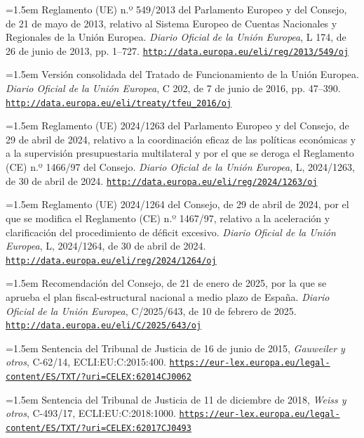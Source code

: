 \documentclass[10pt,a4paper]{article}
\begin{document}
\noindent\hangindent=1.5em Reglamento (UE) n.º 549/2013 del Parlamento Europeo y del Consejo, de 21 de mayo de 2013, relativo al Sistema Europeo de Cuentas Nacionales y Regionales de la Unión Europea. \textit{Diario Oficial de la Unión Europea}, L 174, de 26 de junio de 2013, pp. 1--727. \href{http://data.europa.eu/eli/reg/2013/549/oj}{\nolinkurl{http://data.europa.eu/eli/reg/2013/549/oj}}

\noindent\hangindent=1.5em Versión consolidada del Tratado de Funcionamiento de la Unión Europea. \textit{Diario Oficial de la Unión Europea}, C 202, de 7 de junio de 2016, pp. 47--390. \href{http://data.europa.eu/eli/treaty/tfeu_2016/oj}{\nolinkurl{http://data.europa.eu/eli/treaty/tfeu_2016/oj}}

\noindent\hangindent=1.5em Reglamento (UE) 2024/1263 del Parlamento Europeo y del Consejo, de 29 de abril de 2024, relativo a la coordinación eficaz de las políticas económicas y a la supervisión presupuestaria multilateral y por el que se deroga el Reglamento (CE) n.º 1466/97 del Consejo. \textit{Diario Oficial de la Unión Europea}, L, 2024/1263, de 30 de abril de 2024. \href{http://data.europa.eu/eli/reg/2024/1263/oj}{\nolinkurl{http://data.europa.eu/eli/reg/2024/1263/oj}}

\noindent\hangindent=1.5em Reglamento (UE) 2024/1264 del Consejo, de 29 de abril de 2024, por el que se modifica el Reglamento (CE) n.º 1467/97, relativo a la aceleración y clarificación del procedimiento de déficit excesivo. \textit{Diario Oficial de la Unión Europea}, L, 2024/1264, de 30 de abril de 2024. \href{http://data.europa.eu/eli/reg/2024/1264/oj}{\nolinkurl{http://data.europa.eu/eli/reg/2024/1264/oj}}

\noindent\hangindent=1.5em Recomendación del Consejo, de 21 de enero de 2025, por la que se aprueba el plan fiscal-estructural nacional a medio plazo de España. \textit{Diario Oficial de la Unión Europea}, C/2025/643, de 10 de febrero de 2025. \href{http://data.europa.eu/eli/C/2025/643/oj}{\nolinkurl{http://data.europa.eu/eli/C/2025/643/oj}}

\noindent\hangindent=1.5em Sentencia del Tribunal de Justicia de 16 de junio de 2015, \textit{Gauweiler y otros}, C-62/14, ECLI:EU:C:2015:400. \href{https://eur-lex.europa.eu/legal-content/ES/TXT/?uri=CELEX:62014CJ0062}{\nolinkurl{https://eur-lex.europa.eu/legal-content/ES/TXT/?uri=CELEX:62014CJ0062}}

\noindent\hangindent=1.5em Sentencia del Tribunal de Justicia de 11 de diciembre de 2018, \textit{Weiss y otros}, C-493/17, ECLI:EU:C:2018:1000. \href{https://eur-lex.europa.eu/legal-content/ES/TXT/?uri=CELEX:62017CJ0493}{\nolinkurl{https://eur-lex.europa.eu/legal-content/ES/TXT/?uri=CELEX:62017CJ0493}}
\end{document}
